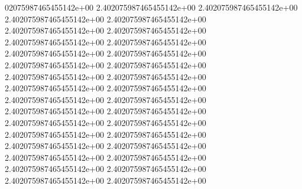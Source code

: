 02075987465455142e+00	2.402075987465455142e+00	2.402075987465455142e+00	2.402075987465455142e+00	2.402075987465455142e+00	2.402075987465455142e+00	2.402075987465455142e+00	2.402075987465455142e+00	2.402075987465455142e+00	2.402075987465455142e+00	2.402075987465455142e+00	2.402075987465455142e+00	2.402075987465455142e+00	2.402075987465455142e+00	2.402075987465455142e+00	2.402075987465455142e+00	2.402075987465455142e+00	2.402075987465455142e+00	2.402075987465455142e+00	2.402075987465455142e+00	2.402075987465455142e+00	2.402075987465455142e+00	2.402075987465455142e+00	2.402075987465455142e+00	2.402075987465455142e+00	2.402075987465455142e+00	2.402075987465455142e+00	2.402075987465455142e+00	2.402075987465455142e+00	2.402075987465455142e+00	2.402075987465455142e+00	2.402075987465455142e+00	2.402075987465455142e+00
